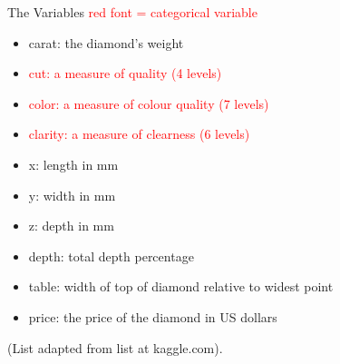 \documentclass[
  ignorenonframetext,
]{beamer}
\providecommand{\tightlist}{%
  \setlength{\itemsep}{0pt}\setlength{\parskip}{0pt}}
\begin{document}
\begin{frame}{The Variables}
\protect\hypertarget{the-variables}{}
\textcolor{red}{red font = categorical variable}

\begin{itemize}
\tightlist
\item
  carat: the diamond's weight
\item
  \textcolor{red}{cut: a measure of quality (4 levels)}
\item
  \textcolor{red}{color: a measure of colour quality (7 levels)}
\item
  \textcolor{red}{clarity: a measure of clearness (6 levels)}
\item
  x: length in mm
\item
  y: width in mm
\item
  z: depth in mm
\item
  depth: total depth percentage
\item
  table: width of top of diamond relative to widest point
\item
  price: the price of the diamond in US dollars
\end{itemize}

(List adapted from list at kaggle.com).
\end{frame}
\end{document}
